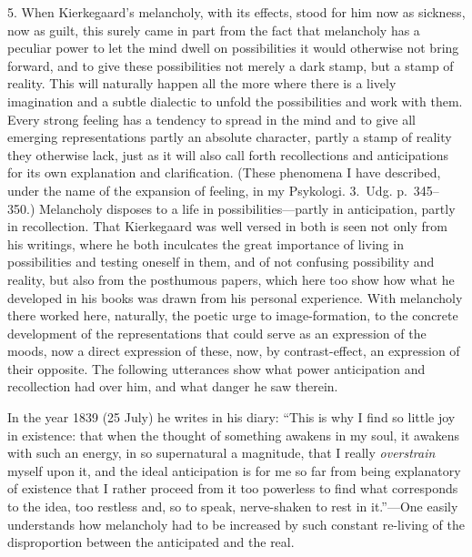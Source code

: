 \documentclass[12pt,a4paper]{book}
\newcommand{\opage}[1]{\marginnote{\footnotesize\textit{[#1]}}}
\begin{document}
\opage{41}5. When Kierkegaard's melancholy, with its effects, stood for him
now as sickness, now as guilt, this surely came in part from the fact
that melancholy has a peculiar power to let the mind dwell on
possibilities it would otherwise not bring forward, and to give these
possibilities not merely a dark stamp, but a stamp of reality. This will
naturally happen all the more where there is a lively imagination and a
subtle dialectic to unfold the possibilities and work with them. Every
strong feeling has a tendency to spread in the mind and to give all
emerging representations partly an absolute character, partly a stamp of
reality they otherwise lack, just as it will also call forth
recollections and anticipations for its own explanation and
clarification. (These phenomena I have described, under the name of the
expansion of feeling, in my Psykologi. 3.~Udg. p.~345--350.) Melancholy
disposes to a life in possibilities---partly in anticipation, partly in
recollection. That Kierkegaard was well versed in both is seen not only
from his writings, where he both inculcates the great importance of
living in possibilities and testing oneself in them, and of not confusing
possibility and reality, but also from the posthumous papers, which here
too show how what he developed in his books was drawn from his personal
experience. With melancholy there worked here, naturally, the poetic urge
to image-formation, to the concrete development of the representations
that could serve as an expression of the moods, now a direct expression
of these, now, by contrast-effect, an expression of their opposite. The
following utterances show what power anticipation and recollection had
over him, and what danger he saw therein.

In the year 1839 (25 July) he writes in his diary: ``This is why I find
so little joy in existence: that when the thought of something awakens in
my soul,
\opage{42}it awakens with such an energy, in so supernatural a magnitude,
that I really \textit{overstrain} myself upon it, and the ideal
anticipation is for me so far from being explanatory of existence that I
rather proceed from it too powerless to find what corresponds to the
idea, too restless and, so to speak, nerve-shaken to rest in
it.''---One easily understands how melancholy had to be increased by
such constant re-living of the disproportion between the anticipated and
the real.
\end{document}
